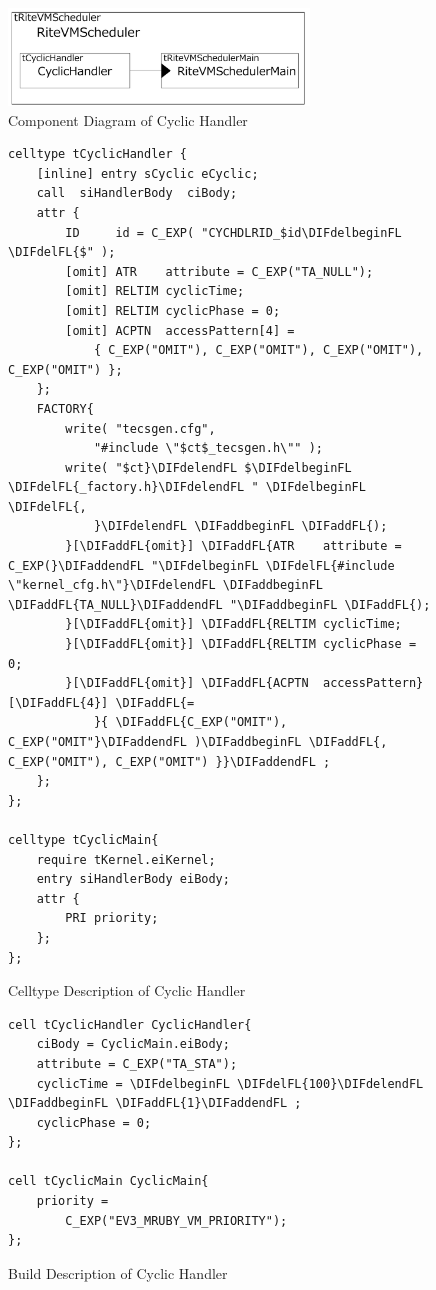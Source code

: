 \documentclass[conference,compsoc]{IEEEtran}
\providecommand{\DIFadd}[1]{{\protect\color{blue}\uwave{#1}}} %
\providecommand{\DIFdel}[1]{{\protect\color{red}\sout{#1}}}                      %
\providecommand{\DIFaddFL}[1]{\DIFadd{#1}} %
\providecommand{\DIFdelFL}[1]{\DIFdel{#1}} %
\providecommand{\DIFaddbeginFL}{} %
\providecommand{\DIFaddendFL}{} %
\providecommand{\DIFdelbeginFL}{} %
\providecommand{\DIFdelendFL}{} %
\begin{document}
\begin{figure}[t]
    \centering
    \includegraphics[width=8cm,clip]{figure/cyclic_handler.pdf}
    \caption{Component Diagram of Cyclic Handler}
    \label{fig:cyclic_handler}
\end{figure}
\begin{figure}[t]
    \centering
    \begin{lstlisting}
celltype tCyclicHandler {
    [inline] entry sCyclic eCyclic;
    call  siHandlerBody  ciBody; 
    attr {
    	ID     id = C_EXP( "CYCHDLRID_$id\DIFdelbeginFL \DIFdelFL{$" );
    	[omit] ATR    attribute = C_EXP("TA_NULL");
    	[omit] RELTIM cyclicTime;
    	[omit] RELTIM cyclicPhase = 0;
        [omit] ACPTN  accessPattern[4] = 
            { C_EXP("OMIT"), C_EXP("OMIT"), C_EXP("OMIT"), C_EXP("OMIT") };
    };
    FACTORY{
    	write( "tecsgen.cfg",
            "#include \"$ct$_tecsgen.h\"" );
    	write( "$ct}\DIFdelendFL $\DIFdelbeginFL \DIFdelFL{_factory.h}\DIFdelendFL " \DIFdelbeginFL \DIFdelFL{,
            }\DIFdelendFL \DIFaddbeginFL \DIFaddFL{);
    	}[\DIFaddFL{omit}] \DIFaddFL{ATR    attribute = C_EXP(}\DIFaddendFL "\DIFdelbeginFL \DIFdelFL{#include \"kernel_cfg.h\"}\DIFdelendFL \DIFaddbeginFL \DIFaddFL{TA_NULL}\DIFaddendFL "\DIFaddbeginFL \DIFaddFL{);
    	}[\DIFaddFL{omit}] \DIFaddFL{RELTIM cyclicTime;
    	}[\DIFaddFL{omit}] \DIFaddFL{RELTIM cyclicPhase = 0;
        }[\DIFaddFL{omit}] \DIFaddFL{ACPTN  accessPattern}[\DIFaddFL{4}] \DIFaddFL{= 
            }{ \DIFaddFL{C_EXP("OMIT"), C_EXP("OMIT"}\DIFaddendFL )\DIFaddbeginFL \DIFaddFL{, C_EXP("OMIT"), C_EXP("OMIT") }}\DIFaddendFL ;
    };
};

celltype tCyclicMain{
    require tKernel.eiKernel;
    entry siHandlerBody eiBody;
    attr {
        PRI priority;
    };
};
    \end{lstlisting}
    \caption{Celltype Description of Cyclic Handler}
    \label{celltype_cyclic_handler}
\end{figure}


\begin{figure}[t]
    \centering
    \begin{lstlisting}
cell tCyclicHandler CyclicHandler{
    ciBody = CyclicMain.eiBody;
    attribute = C_EXP("TA_STA");
    cyclicTime = \DIFdelbeginFL \DIFdelFL{100}\DIFdelendFL \DIFaddbeginFL \DIFaddFL{1}\DIFaddendFL ;
    cyclicPhase = 0;
};

cell tCyclicMain CyclicMain{
    priority = 
        C_EXP("EV3_MRUBY_VM_PRIORITY");
};
   \end{lstlisting}
    \caption{Build Description of Cyclic Handler}
    \label{build_cyclic_handler}
\end{figure}
\end{document}
